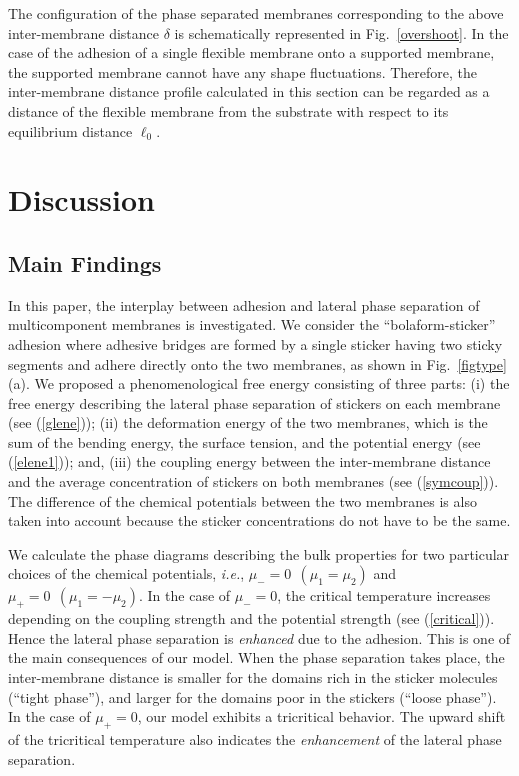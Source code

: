 The configuration of the phase separated membranes corresponding
to the above inter-membrane distance $\delta$ is schematically
represented in Fig.\ \ref{overshoot}.
In the case of the adhesion of a single flexible membrane onto a
supported membrane, the supported membrane cannot have any shape
fluctuations.
Therefore, the inter-membrane distance profile calculated in this
section can be regarded as a distance of the flexible membrane
from the substrate with respect to its equilibrium distance $\ell_0$.




\section{Discussion}
\label{sec:discussion}


\subsection{Main Findings}


In this paper,  the interplay between adhesion and lateral phase
separation of multicomponent membranes is investigated. We
consider the ``bolaform-sticker'' adhesion where adhesive bridges
are formed by a single sticker having two sticky segments and
adhere directly onto the two membranes, as shown in Fig.\
\ref{figtype}(a). We proposed a phenomenological free energy
consisting of three parts: (i) the free energy  describing the
lateral phase separation of stickers on each membrane (see
(\ref{glene})); (ii) the deformation energy of the two membranes,
which is the sum of the bending energy, the surface tension, and
the potential energy (see (\ref{elene1})); and, (iii) the coupling
energy between the inter-membrane distance and the average
concentration of stickers on both membranes (see (\ref{symcoup})).
The difference of the chemical potentials between the two
membranes is also taken into account because the sticker
concentrations do not have to be the same.


We calculate the phase diagrams describing the bulk properties
for two particular choices of the chemical potentials, {\it i.e.},
$\mu_-=0~~ (\mu_1 = \mu_2)$ and $\mu_+=0~~ (\mu_1 = -\mu_2)$.
In the case of $\mu_-=0$, the critical temperature
increases depending on the coupling strength and
the potential strength (see (\ref{critical})).
Hence the lateral phase separation is {\it enhanced} due to the
adhesion.
This is one of the main consequences of our model.
When the phase separation takes place,
the inter-membrane distance is smaller for the domains rich in the
sticker molecules (``tight phase''), and  larger
for the domains poor in the stickers (``loose phase'').
In the case of $\mu_+=0$, our model exhibits a tricritical behavior.
The upward shift of the tricritical temperature also indicates the
{\it enhancement} of the lateral phase separation.


